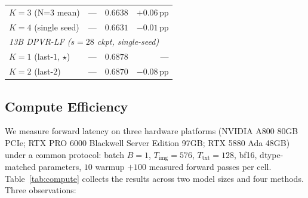 \documentclass[a4paper,fleqn,review]{cas-sc}
\newcommand{\dpvrlf}{DPVR-LF}
\begin{document}
\begin{table}[t]
\begin{tabular}{lrrr}
$K = 3$ (N=3 mean)          & ---            & $0.6638$         & $+0.06$\,pp \\
$K = 4$ (single seed)       & ---            & $0.6631$         & $-0.01$\,pp \\
\midrule
\multicolumn{4}{l}{\emph{13B \dpvrlf{} ($s = 28$ ckpt, single-seed)}} \\
\rowcolor[RGB]{236,244,252}
$K = 1$ (last-$1$, $\star$)   & ---            & $0.6878$         & ---         \\
$K = 2$ (last-$2$)          & ---            & $0.6870$         & $-0.08$\,pp \\
\bottomrule
\end{tabular}
\end{table}


\subsection{Compute Efficiency}\label{sec:exp-compute}

We measure forward latency on three hardware platforms (NVIDIA A800
80GB PCIe; RTX PRO 6000 Blackwell Server Edition 97GB; RTX 5880 Ada
48GB) under a common protocol: batch $B = 1$, $T_{\mathrm{img}} = 576$,
$T_{\mathrm{txt}} = 128$, bf16, dtype-matched parameters, $10$ warmup
$+ 100$ measured forward passes per cell. Table~\ref{tab:compute}
collects the results across two model sizes and four methods. Three
observations:
\end{document}
